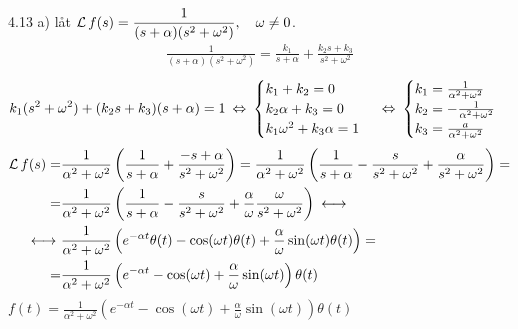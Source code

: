 \begin{task}{4.13 a)}
	låt $\operatorname{\mathcal{L}} f(s)=\dfrac{1}{(s+\alpha)(s^2+\omega^2)}, \quad \omega \neq 0$.
	\begin{align*}
	\frac{1}{(s+\alpha)(s^2+\omega^2)}=
	\frac{k_1}{s+\alpha}+\frac{k_2s+k_3}{s^2+\omega^2}
	\end{align*}
	\[k_1(s^2+\omega^2)+(k_2s+k_3)(s+\alpha)=1\lra
	\begin{cases}
	k_1+k_2=0 \\
	k_2\alpha +k_3=0 \\
	k_1\omega^2+k_3\alpha=1
	\end{cases}\lra
	\begin{cases}
	k_1=\frac{1}{\alpha^2+\omega^2} \\
	k_2=-\frac{1}{\alpha^2+\omega^2} \\
	k_3=\frac{a}{\alpha^2+\omega^2}
	\end{cases}\]
	\begin{align*}
	\laplace f(s)=
	&\frac{1}{\alpha^2+\omega^2}\left(\frac{1}{s+\alpha}+\frac{-s+\alpha}{s^2+\omega^2}\right)=
	\frac{1}{\alpha^2+\omega^2}\left(\frac{1}{s+\alpha}-\frac{s}{s^2+\omega^2}+\frac{\alpha}{s^2+\omega^2}\right)= \\ =
	&\frac{1}{\alpha^2+\omega^2}\left(\frac{1}{s+\alpha}-\frac{s}{s^2+\omega^2}+\frac{\alpha}{\omega}\frac{\omega}{s^2+\omega^2}\right) \llra \\ \llra
	&\frac{1}{\alpha^2+\omega^2}\left(e^{-\alpha t}\theta(t)-\cos(\omega t)\theta(t)+\frac{\alpha}{\omega}\sin(\omega t)\theta(t)\right)= \\ =
	&\frac{1}{\alpha^2+\omega^2}\left(e^{-\alpha t}-\cos(\omega t)+\frac{\alpha}{\omega}\sin(\omega t)\right)\theta(t)
	\end{align*}
	\ans $f(t)=\frac{1}{\alpha^2+\omega^2}\left(e^{-\alpha t}-\cos(\omega t)+\frac{\alpha}{\omega}\sin(\omega t)\right)\theta(t)$
\end{task}